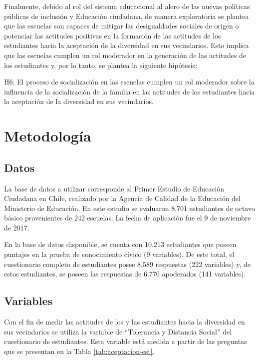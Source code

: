 \documentclass[12pt,twoside]{templates/facsothesis}
\begin{document}
Finalmente, debido al rol del sistema educacional al alero de las nuevas políticas públicas de inclusión y Educación ciudadana, de manera exploratoria se plantea que las escuelas son capaces de mitigar las desigualdades sociales de origen o potenciar las actitudes positivas en la formación de las actitudes de los estudiantes hacia la aceptación de la diversidad en sus vecindarios. Esto implica que las escuelas cumplen un rol moderador en la generación de las actitudes de los estudiantes y, por lo tanto, se plantea la siguiente hipótesis:

H6: El proceso de socialización en las escuelas cumplen un rol moderador sobre la influencia de la socialización de la familia en las actitudes de los estudiantes hacia la aceptación de la diversidad en sus vecindarios.

\hypertarget{metodologuxeda}{%
\chapter{Metodología}\label{metodologuxeda}}

\hypertarget{datos}{%
\section{Datos}\label{datos}}

La base de datos a utilizar corresponde al Primer Estudio de Educación Ciudadana en Chile, realizado por la Agencia de Calidad de la Educación del Ministerio de Educación. En este estudio se evaluaron 8.701 estudiantes de octavo básico provenientes de 242 escuelas. La fecha de aplicación fue el 9 de noviembre de 2017.

En la base de datos disponible, se cuenta con 10.213 estudiantes que poseen puntajes en la prueba de conocimiento cívico (9 variables). De este total, el cuestionario completo de estudiantes posee 8.589 respuestas (222 variables) y, de estos estudiantes, se poseen las respuestas de 6.770 apoderados (141 variables).

\hypertarget{variables}{%
\section{Variables}\label{variables}}

Con el fin de medir las actitudes de los y las estudiantes hacia la diversidad en sus vecindarios se utiliza la variable de ``Tolerancia y Distancia Social'' del cuestionario de estudiantes. Esta variable está medida a partir de las preguntas que se presentan en la Tabla \ref{tab:aceptacion-est}.
\end{document}
